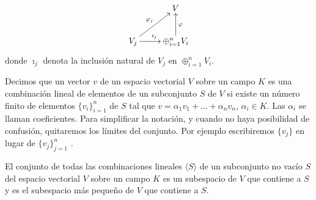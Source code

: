 	 		   \[  \xymatrix{%
	 		   	&V \\
	 		   	V_{j} \ar[r]^{\imath_{j}} \ar[ru]^{\varphi_{j}} & \oplus^{n}_{i=1} \ar[u]_{\varphi}  V_{i}
	 		   }
	 		   \]
	 		   donde $ \imath_{j} $ denota la inclusión natural de $ V_{j} $ en  $ \oplus^{n}_{i=1} V_{i}$.
	 		   \begin{defi}
	 		   	 Decimos que un vector $ v $ de un espacio vectorial $ V $ sobre
	 		   	un campo $ K $ es una combinación lineal de elementos de un subconjunto $ S $ de $ V $ si existe un número finito de elementos $ \{v_{i}\}^{n}_{i=1} $ de $ S $ tal que $ v = \alpha_{1} v_{1} + \ldots + \alpha_{n}  v_{n} $, $ \alpha_{i} \in K $. Las $ \alpha_{i} $ se llaman coeficientes.
	 		   	Para simplificar la notación, y cuando no haya posibilidad de confusión, quitaremos los límites del conjunto. Por ejemplo escribiremos $ \{v_{j}\} $ en lugar de $ \{v_{j}\}^{n}_{j=1} $ .
	 		   \end{defi}
 		   
 		   		\begin{teo}
 		   			El conjunto de todas las combinaciones lineales $ \langle S \rangle $ de un subconjunto no vacío $ S $ del espacio vectorial $ V $ sobre un campo $ K $ es un subespacio de $ V $ que contiene a $ S $ y es el subespacio más pequeño de $ V $ que contiene a $ S $.
 		   		\end{teo}
 	   			
